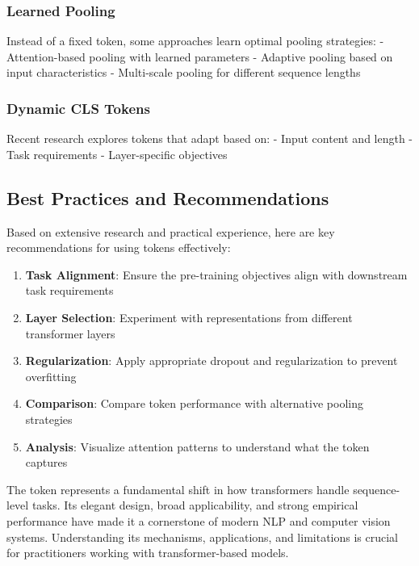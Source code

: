 \subsubsection{Learned Pooling}
Instead of a fixed \cls{} token, some approaches learn optimal pooling strategies:
- Attention-based pooling with learned parameters
- Adaptive pooling based on input characteristics
- Multi-scale pooling for different sequence lengths

\subsubsection{Dynamic CLS Tokens}
Recent research explores \cls{} tokens that adapt based on:
- Input content and length
- Task requirements
- Layer-specific objectives

\subsection{Best Practices and Recommendations}

Based on extensive research and practical experience, here are key recommendations for using \cls{} tokens effectively:

\begin{principle}
\begin{enumerate}
\item \textbf{Task Alignment}: Ensure the pre-training objectives align with downstream task requirements
\item \textbf{Layer Selection}: Experiment with \cls{} representations from different transformer layers
\item \textbf{Regularization}: Apply appropriate dropout and regularization to prevent overfitting
\item \textbf{Comparison}: Compare \cls{} token performance with alternative pooling strategies
\item \textbf{Analysis}: Visualize attention patterns to understand what the \cls{} token captures
\end{enumerate}
\end{principle}
\begin{comment}
Feedback: This is a good list of principles, but it could be more actionable. For example, for "Task Alignment," you could add: "If your downstream task is very different from Next Sentence Prediction (e.g., fine-grained sentiment analysis), be aware that the [CLS] token's pre-trained representation may not be optimal and may require more aggressive fine-tuning." For "Layer Selection," you could suggest: "Start with the final layer's [CLS] token as a strong baseline, but if performance is suboptimal, consider concatenating or averaging the [CLS] representations from the last 2-4 layers, as this can sometimes provide a richer signal."
\end{comment}

The \cls{} token represents a fundamental shift in how transformers handle sequence-level tasks. Its elegant design, broad applicability, and strong empirical performance have made it a cornerstone of modern NLP and computer vision systems. Understanding its mechanisms, applications, and limitations is crucial for practitioners working with transformer-based models.